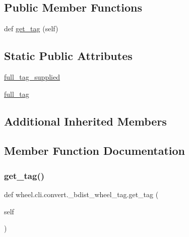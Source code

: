 \subsection*{Public Member Functions}
\begin{DoxyCompactItemize}
\item 
def \hyperlink{classwheel_1_1cli_1_1convert_1_1__bdist__wheel__tag_a6c374a80e7664e3e45c6f8a7d1392767}{get\+\_\+tag} (self)
\end{DoxyCompactItemize}
\subsection*{Static Public Attributes}
\begin{DoxyCompactItemize}
\item 
\hyperlink{classwheel_1_1cli_1_1convert_1_1__bdist__wheel__tag_a630be92a0d41970e79a5e92fe1c5cae0}{full\+\_\+tag\+\_\+supplied}
\item 
\hyperlink{classwheel_1_1cli_1_1convert_1_1__bdist__wheel__tag_a0b61d5631f5b28e2c0f614f5f54f63c8}{full\+\_\+tag}
\end{DoxyCompactItemize}
\subsection*{Additional Inherited Members}


\subsection{Member Function Documentation}
\mbox{\label{classwheel_1_1cli_1_1convert_1_1__bdist__wheel__tag_a6c374a80e7664e3e45c6f8a7d1392767}} 
\subsubsection{\texorpdfstring{get\+\_\+tag()}{get\_tag()}}
{\footnotesize\ttfamily def wheel.\+cli.\+convert.\+\_\+bdist\+\_\+wheel\+\_\+tag.\+get\+\_\+tag (\begin{DoxyParamCaption}\item[{}]{self }\end{DoxyParamCaption})}



